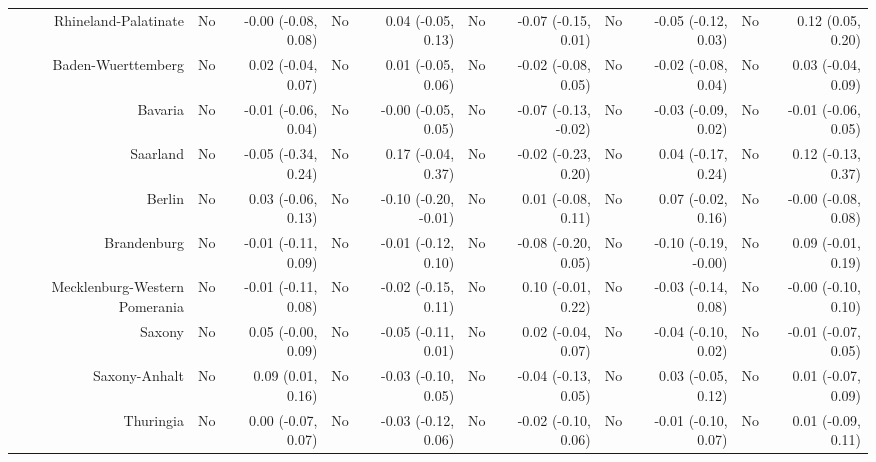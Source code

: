 \documentclass[
  man,floatsintext]{apa6}
\newenvironment{lltable}{\begin{landscape}\centering\begin{ThreePartTable}}{\end{ThreePartTable}\end{landscape}}
\begin{document}
\begin{lltable}
{\begin{longtable}{rrrrrrrrrrr}
Rhineland-Palatinate & No & -0.00 (-0.08, 0.08) & No & 0.04 (-0.05, 0.13) & No & -0.07 (-0.15, 0.01) & No & -0.05 (-0.12, 0.03) & No & 0.12 (0.05, 0.20)\\
Baden-Wuerttemberg & No & 0.02 (-0.04, 0.07) & No & 0.01 (-0.05, 0.06) & No & -0.02 (-0.08, 0.05) & No & -0.02 (-0.08, 0.04) & No & 0.03 (-0.04, 0.09)\\
Bavaria & No & -0.01 (-0.06, 0.04) & No & -0.00 (-0.05, 0.05) & No & -0.07 (-0.13, -0.02) & No & -0.03 (-0.09, 0.02) & No & -0.01 (-0.06, 0.05)\\
Saarland & No & -0.05 (-0.34, 0.24) & No & 0.17 (-0.04, 0.37) & No & -0.02 (-0.23, 0.20) & No & 0.04 (-0.17, 0.24) & No & 0.12 (-0.13, 0.37)\\
Berlin & No & 0.03 (-0.06, 0.13) & No & -0.10 (-0.20, -0.01) & No & 0.01 (-0.08, 0.11) & No & 0.07 (-0.02, 0.16) & No & -0.00 (-0.08, 0.08)\\
Brandenburg & No & -0.01 (-0.11, 0.09) & No & -0.01 (-0.12, 0.10) & No & -0.08 (-0.20, 0.05) & No & -0.10 (-0.19, -0.00) & No & 0.09 (-0.01, 0.19)\\
Mecklenburg-Western Pomerania & No & -0.01 (-0.11, 0.08) & No & -0.02 (-0.15, 0.11) & No & 0.10 (-0.01, 0.22) & No & -0.03 (-0.14, 0.08) & No & -0.00 (-0.10, 0.10)\\
Saxony & No & 0.05 (-0.00, 0.09) & No & -0.05 (-0.11, 0.01) & No & 0.02 (-0.04, 0.07) & No & -0.04 (-0.10, 0.02) & No & -0.01 (-0.07, 0.05)\\
Saxony-Anhalt & No & 0.09 (0.01, 0.16) & No & -0.03 (-0.10, 0.05) & No & -0.04 (-0.13, 0.05) & No & 0.03 (-0.05, 0.12) & No & 0.01 (-0.07, 0.09)\\
Thuringia & No & 0.00 (-0.07, 0.07) & No & -0.03 (-0.12, 0.06) & No & -0.02 (-0.10, 0.06) & No & -0.01 (-0.10, 0.07) & No & 0.01 (-0.09, 0.11)\\
\bottomrule
\end{longtable}

}

\end{lltable}
\end{document}
